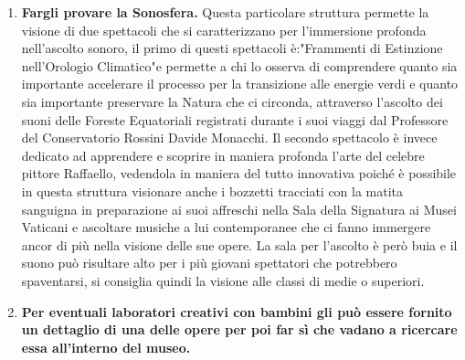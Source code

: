 \documentclass[hidelinks,12pt,a4paper]{article}
\begin{document}
\begin{flushleft}
\begin{enumerate}
			\item \textbf{Fargli provare la Sonosfera.}
			Questa particolare struttura permette la visione di due spettacoli che si caratterizzano per l'immersione profonda nell'ascolto sonoro, il primo di questi spettacoli è:"Frammenti di Estinzione nell'Orologio Climatico"e permette a chi lo osserva di comprendere quanto sia importante accelerare il processo per la transizione alle energie verdi e quanto sia importante preservare la Natura che ci circonda, attraverso l'ascolto dei suoni delle Foreste Equatoriali registrati durante i suoi viaggi dal Professore del Conservatorio Rossini Davide Monacchi. Il secondo spettacolo è invece dedicato ad apprendere e scoprire in maniera profonda l'arte del celebre pittore Raffaello, vedendola in maniera del tutto innovativa poiché è possibile in questa struttura visionare anche i bozzetti tracciati con la matita sanguigna in preparazione ai suoi affreschi nella Sala della Signatura ai Musei Vaticani e ascoltare musiche a lui contemporanee che ci fanno immergere ancor di più nella visione delle sue opere. La sala per l'ascolto è però buia e il suono può risultare alto per i più giovani spettatori che potrebbero spaventarsi, si consiglia quindi la visione alle classi di medie o superiori.
			
			\newpage
			
			\item \textbf{Per eventuali laboratori creativi con bambini gli può essere fornito un dettaglio di una delle opere per poi far sì che vadano a ricercare essa all'interno del museo.}
	
	
			\end{enumerate}
			\newpage
			\listoffigures

			\vspace*{\fill}
			\doclicenseThis
	\end{flushleft}
\end{document}
